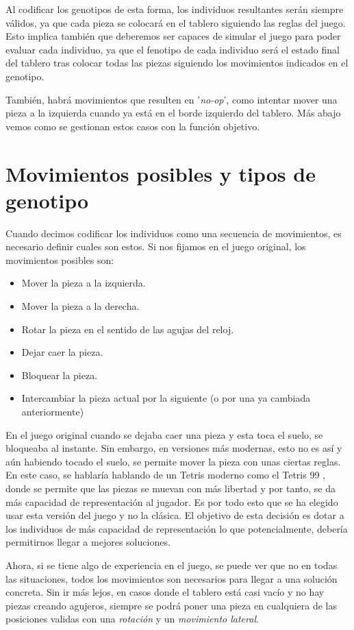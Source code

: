 \documentclass[11pt,spanish,listoffigures,listoftables]{tfgetsinf}
\begin{document}
Al codificar los genotipos de esta forma, los individuos resultantes serán siempre válidos, ya que cada pieza se colocará en el tablero siguiendo las reglas del juego. Esto implica también que deberemos ser capaces de simular el juego para poder evaluar cada individuo, ya que el fenotipo de cada individuo será el estado final del tablero tras colocar todas las piezas siguiendo los movimientos indicados en el genotipo.

También, habrá movimientos que resulten en '\textit{no-op}', como intentar mover una pieza a la izquierda cuando ya está en el borde izquierdo del tablero. Más abajo vemos como se gestionan estos casos con la función objetivo.

\section{Movimientos posibles y tipos de genotipo}
Cuando decimos codificar los individuos como una secuencia de movimientos, es necesario definir cuales son estos. Si nos fijamos en el juego original, los movimientos posibles son:

\begin{itemize}
    \item Mover la pieza a la izquierda.
    \item Mover la pieza a la derecha.
    \item Rotar la pieza en el sentido de las agujas del reloj.
    \item Dejar caer la pieza.
    \item Bloquear la pieza.
    \item Intercambiar la pieza actual por la siguiente (o por una ya cambiada anteriormente)
\end{itemize}

En el juego original cuando se dejaba caer una pieza y esta toca el suelo, se bloqueaba al instante. Sin embargo, en versiones más modernas, esto no es así y aún habiendo tocado el suelo, se permite mover la pieza con unas ciertas reglas. En este caso, se hablaría hablando de un Tetris moderno como el Tetris 99 \cite{}, donde se permite que las piezas se muevan con más libertad y por tanto, se da más capacidad de representación al jugador. Es por todo esto que se ha elegido usar esta versión del juego y no la clásica. El objetivo de esta decisión es dotar a los individuos de más capacidad de representación lo que potencialmente, debería permitirnos llegar a mejores soluciones.

Ahora, si se tiene algo de experiencia en el juego, se puede ver que no en todas las situaciones, todos los movimientos son necesarios para llegar a una solución concreta. Sin ir más lejos, en casos donde el tablero está casi vacío y no hay piezas creando agujeros, siempre se podrá poner una pieza en cualquiera de las posiciones validas con una \textit{rotación} y un \textit{movimiento lateral}.
\end{document}
